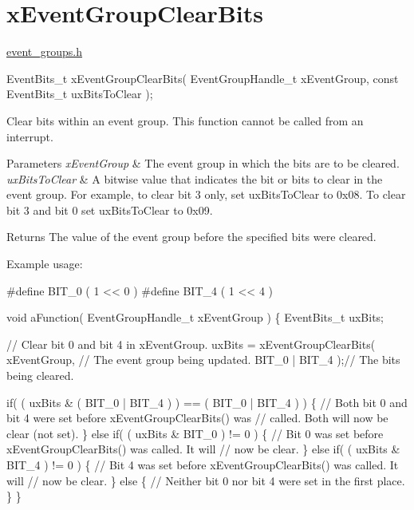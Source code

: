 \hypertarget{group__x_event_group_clear_bits}{}\section{x\+Event\+Group\+Clear\+Bits}
\label{group__x_event_group_clear_bits}
\mbox{\hyperlink{event__groups_8h_source}{event\+\_\+groups.\+h}} 
\begin{DoxyPre}
   EventBits\_t xEventGroupClearBits( EventGroupHandle\_t xEventGroup, const EventBits\_t uxBitsToClear );
\end{DoxyPre}


Clear bits within an event group. This function cannot be called from an interrupt.


\begin{DoxyParams}{Parameters}
{\em x\+Event\+Group} & The event group in which the bits are to be cleared.\\
\hline
{\em ux\+Bits\+To\+Clear} & A bitwise value that indicates the bit or bits to clear in the event group. For example, to clear bit 3 only, set ux\+Bits\+To\+Clear to 0x08. To clear bit 3 and bit 0 set ux\+Bits\+To\+Clear to 0x09.\\
\hline
\end{DoxyParams}
\begin{DoxyReturn}{Returns}
The value of the event group before the specified bits were cleared.
\end{DoxyReturn}
Example usage\+: 
\begin{DoxyPre}
  \#define BIT\_0 ( 1 << 0 )
  \#define BIT\_4 ( 1 << 4 )\end{DoxyPre}



\begin{DoxyPre}  void aFunction( EventGroupHandle\_t xEventGroup )
  \{
  EventBits\_t uxBits;\end{DoxyPre}



\begin{DoxyPre}    // Clear bit 0 and bit 4 in xEventGroup.
    uxBits = xEventGroupClearBits(
                            xEventGroup,    // The event group being updated.
                            BIT\_0 | BIT\_4 );// The bits being cleared.\end{DoxyPre}



\begin{DoxyPre}    if( ( uxBits \& ( BIT\_0 | BIT\_4 ) ) == ( BIT\_0 | BIT\_4 ) )
    \{
        // Both bit 0 and bit 4 were set before xEventGroupClearBits() was
        // called.  Both will now be clear (not set).
    \}
    else if( ( uxBits \& BIT\_0 ) != 0 )
    \{
        // Bit 0 was set before xEventGroupClearBits() was called.  It will
        // now be clear.
    \}
    else if( ( uxBits \& BIT\_4 ) != 0 )
    \{
        // Bit 4 was set before xEventGroupClearBits() was called.  It will
        // now be clear.
    \}
    else
    \{
        // Neither bit 0 nor bit 4 were set in the first place.
    \}
  \}
  \end{DoxyPre}
 